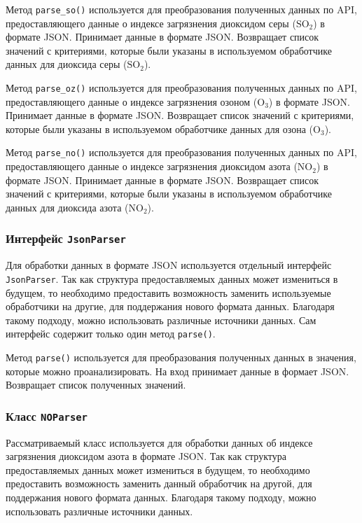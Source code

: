 Метод \texttt{parse\_so()} используется для преобразования полученных данных по API, предоставляющего данные о индексе загрязнения диоксидом серы ($ \text{SO}_{\text{2}} $) в формате JSON.
Принимает данные в формате JSON.
Возвращает список значений с критериями, которые были указаны в используемом обработчике данных для диоксида серы ($ \text{SO}_{\text{2}} $).


Метод \texttt{parse\_oz()} используется для преобразования полученных данных по API, предоставляющего данные о индексе загрязнения озоном ($ \text{O}_{\text{3}} $) в формате JSON.
Принимает данные в формате JSON.
Возвращает список значений с критериями, которые были указаны в используемом обработчике данных для озона ($ \text{O}_{\text{3}} $).


Метод \texttt{parse\_no()} используется для преобразования полученных данных по API, предоставляющего данные о индексе загрязнения диоксидом азота ($ \text{NO}_{\text{2}} $) в формате JSON.
Принимает данные в формате JSON.
Возвращает список значений с критериями, которые были указаны в используемом обработчике данных для диоксида азота ($ \text{NO}_{\text{2}} $).


\subsubsection{Интерфейс \texttt{JsonParser}}
Для обработки данных в формате JSON используется отдельный интерфейс \texttt{JsonParser}.
Так как структура предоставляемых данных может измениться в будущем, то необходимо предоставить возможность заменить используемые обработчики на другие, для поддержания нового формата данных.
Благодаря такому подходу, можно использовать различные источники данных.
Сам интерфейс содержит только один метод \texttt{parse()}.

Метод \texttt{parse()} используется для преобразования полученных данных в значения, которые можно проанализировать.
На вход принимает данные в формает JSON.
Возвращает список полученных значений.


\subsubsection{Класс \texttt{NOParser}}
Рассматриваемый класс используется для обработки данных об индексе загрязнения диоксидом азота в формате JSON.
Так как структура предоставляемых данных может измениться в будущем, то необходимо предоставить возможность заменить данный обработчик на другой, для поддержания нового формата данных.
Благодаря такому подходу, можно использовать различные источники данных.

